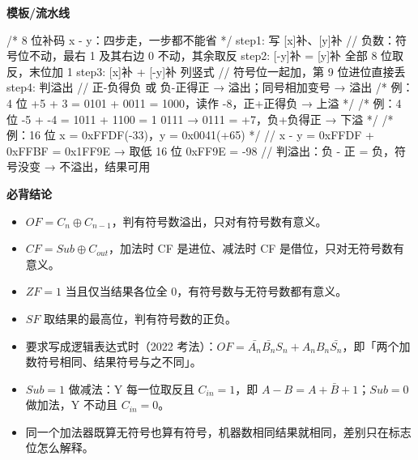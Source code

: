 \documentclass[10pt,a4paper]{ctexart}
\begin{document}
\textbf{模板/流水线}

\begin{codebox}
/* 8 位补码 x - y：四步走，一步都不能省 */
step1: 写 [x]补、[y]补        // 负数：符号位不动，最右 1 及其右边 0 不动，其余取反
step2: [-y]补 = [y]补 全部 8 位取反，末位加 1
step3: [x]补 + [-y]补 列竖式  // 符号位一起加，第 9 位进位直接丢
step4: 判溢出              // 正-负得负 或 负-正得正 → 溢出；同号相加变号 → 溢出
/* 例：4 位 +5 + 3 = 0101 + 0011 = 1000，读作 -8，正+正得负 → 上溢 */
/* 例：4 位 -5 + -4 = 1011 + 1100 = 1 0111 → 0111 = +7，负+负得正 → 下溢 */
/* 例：16 位 x = 0xFFDF(-33)，y = 0x0041(+65) */
// x - y = 0xFFDF + 0xFFBF = 0x1FF9E → 取低 16 位 0xFF9E = -98
// 判溢出：负 - 正 = 负，符号没变 → 不溢出，结果可用
\end{codebox}




\textbf{必背结论}

\begin{itemize}

\item $OF=C_n \oplus C_{n-1}$，判有符号数溢出，只对有符号数有意义。

\item $CF=Sub \oplus C_{out}$，加法时 CF 是进位、减法时 CF 是借位，只对无符号数有意义。

\item $ZF=1$ 当且仅当结果各位全 0，有符号数与无符号数都有意义。

\item $SF$ 取结果的最高位，判有符号数的正负。

\item 要求写成逻辑表达式时（2022 考法）：$OF=\bar{A_n}\bar{B_n}S_n+A_nB_n\bar{S_n}$，即「两个加数符号相同、结果符号与之不同」。

\item $Sub=1$ 做减法：Y 每一位取反且 $C_{in}=1$，即 $A-B=A+\bar{B}+1$；$Sub=0$ 做加法，Y 不动且 $C_{in}=0$。

\item 同一个加法器既算无符号也算有符号，机器数相同结果就相同，差别只在标志位怎么解释。

\end{itemize}
\end{document}
